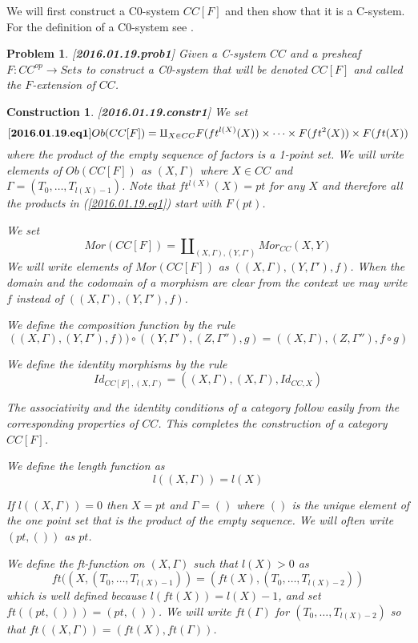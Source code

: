 \documentclass[11pt]{article}
\newenvironment{eq}{\begin{equation}}{\end{equation}}
\newtheorem{problem}[proposition]{Problem}
\newtheorem{construction}[proposition]{Construction}
\newcommand{\llabel}[1]{\label{#1}[{\bf #1}]}
\newcommand{\sr}{\rightarrow}
\begin{document}
We will first construct a C0-system $CC[F]$ and then show that it is a C-system. For the definition of a C0-system see \cite[Definition 2.1]{Csubsystems}.
%
\begin{problem}\llabel{2016.01.19.prob1}
Given a C-system $CC$ and a presheaf $F:CC^{op}\sr Sets$ to construct a C0-system that will be denoted $CC[F]$ and called the $F$-extension of $CC$.
\end{problem}
%
\begin{construction}\rm\llabel{2016.01.19.constr1}
We set 
%
\begin{eq}\llabel{2016.01.19.eq1}
Ob(CC[F])=\amalg_{X\in CC} F(ft^{l(X)}(X))\times\dots\times F(ft^2(X))\times F(ft(X))
\end{eq}
%
where the product of the empty sequence of factors is a 1-point set. We will write elements of $Ob(CC[F])$ as $(X,\Gamma)$ where $X\in CC$ and $\Gamma=(T_0,\dots,T_{l(X)-1})$. Note that $ft^{l(X)}(X)=pt$ for any $X$ and therefore all the products in (\ref{2016.01.19.eq1}) start with $F(pt)$.

We set
%
$$Mor(CC[F])=\amalg_{(X,\Gamma),(Y,\Gamma')}Mor_{CC}(X,Y)$$
%
We will write elements of $Mor(CC[F])$ as $((X,\Gamma),(Y,\Gamma'),f)$. When the domain and the codomain of a morphism are clear from the context we may write $f$ instead of $((X,\Gamma),(Y,\Gamma'),f)$. 

We define the composition function by the rule
%
$$((X,\Gamma),(Y,\Gamma'),f))\circ ((Y,\Gamma'),(Z,\Gamma''),g)=((X,\Gamma),(Z,\Gamma''),f\circ g)$$

We define the identity morphisms by the rule
%
$$Id_{CC[F],(X,\Gamma)}=((X,\Gamma),(X,\Gamma),Id_{CC,X})$$
%

The associativity and the identity conditions of a category follow easily from the corresponding properties of  $CC$. This completes the construction of a category  $CC[F]$. 

We define the length function as
%
$$l((X,\Gamma))=l(X)$$

If $l((X,\Gamma))=0$ then $X=pt$ and $\Gamma=()$ where $()$ is the unique element of the one point set that is the product of the empty sequence. We will often write $(pt,())$ as $pt$. 

We define the ft-function on $(X,\Gamma)$ such that $l(X)>0$ as 
%
$$ft((X,(T_0,\dots,T_{l(X)-1}))=(ft(X),(T_0,\dots,T_{l(X)-2}))$$
%
which is well defined because $l(ft(X))=l(X)-1$, and set $ft((pt,()))=(pt,())$. We will write $ft(\Gamma)$ for $(T_0,\dots,T_{l(X)-2})$ so that $ft((X,\Gamma))=(ft(X),ft(\Gamma))$. 


\end{construction}
\end{document}
